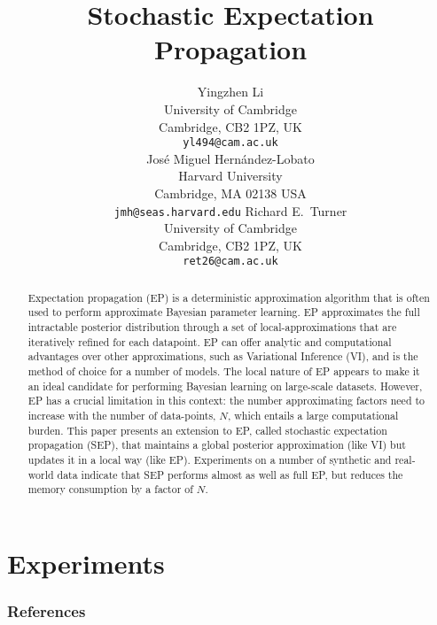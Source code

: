 \documentclass{article} %
\title{Stochastic Expectation Propagation}
\author{
Yingzhen Li \\
University of Cambridge\\
Cambridge, CB2 1PZ, UK \\
\texttt{yl494@cam.ac.uk} \\
\And
Jos\'e Miguel Hern\'andez-Lobato\\
Harvard University \\
Cambridge, MA 02138 USA \\
\texttt{jmh@seas.harvard.edu}
\And
Richard E.~Turner \\
University of Cambridge\\
Cambridge, CB2 1PZ, UK \\
\texttt{ret26@cam.ac.uk} \\
}
\begin{document}
\maketitle

\begin{abstract}
Expectation propagation (EP) is a deterministic approximation algorithm that is often used to perform approximate Bayesian parameter learning. EP approximates the full intractable posterior distribution through a set of local-approximations that are iteratively refined for each datapoint. EP can offer analytic and computational advantages over other approximations, such as Variational Inference (VI), and is the method of choice for a number of models. The local nature of EP appears to make it an ideal candidate for performing Bayesian learning on large-scale datasets. However, EP has a crucial limitation in this context: the number approximating factors need to increase with the number of data-points, $N$, which entails a large computational burden. This paper presents an extension to EP, called stochastic expectation propagation (SEP), that maintains a global posterior approximation (like VI) but updates it in a local way (like EP).  Experiments on a number of synthetic and real-world data indicate that SEP performs almost as well as full EP, but reduces the memory consumption by a factor of $N$. 
\end{abstract}







%

%

\section{Experiments}






\subsubsection*{References}
\renewcommand{\section}[2]{}


\end{document}
